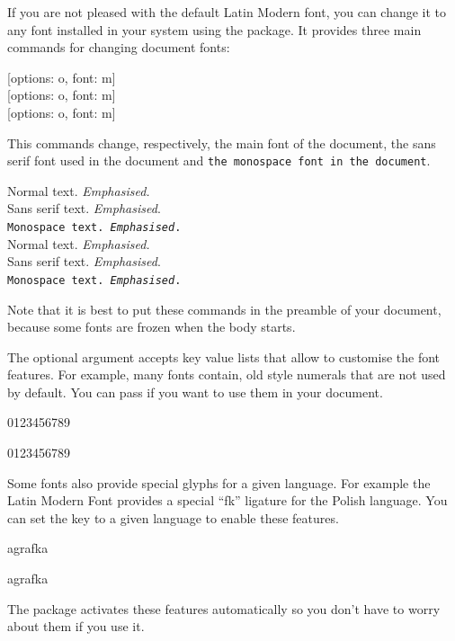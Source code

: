 If you are not pleased with the default Latin Modern font, you can change it to
any font installed in your system using the  package. It provides
three main commands for changing document fonts:
\begin{lscommand}
  [options: o, font: m] \\
  [options: o, font: m] \\
  [options: o, font: m]
\end{lscommand}
This commands change, respectively, the main font of the document, \textsf{the
  sans serif font used in the document} and \texttt{the monospace font in the
  document}.
\begin{example}
Normal text.
  \emph{Emphasised.} \\
\textsf{Sans serif text.
  \emph{Emphasised}.} \\
\texttt{Monospace text.
  \emph{Emphasised}.} \\

\setmainfont{Source Serif 4}
\setsansfont{Source Sans 3}
\setmonofont{Source Code Pro}
Normal text.
  \emph{Emphasised.} \\
\textsf{Sans serif text.
  \emph{Emphasised}.} \\
\texttt{Monospace text.
  \emph{Emphasised}.}
\end{example}
Note that it is best to put these commands in the preamble of your document,
because some fonts are frozen when the body starts.

The optional  argument accepts key value lists that allow to
customise the font features. For example, many fonts contain,
old style numerals that are not used by default. You can pass
 if you want to use them in your document.
\begin{example}
\setmainfont{Source Serif 4}
0123456789

\setmainfont[
  Numbers=OldStyle,
]{Source Serif 4}
0123456789
\end{example}

Some fonts also provide special glyphs for a given language. For example the
Latin Modern Font provides a special
\enquote{\setmainfont[Language=Polish]{Latin Modern Roman}fk} ligature for the
Polish language. You can set the  key to a given language to
enable these features.
\begin{example}
agrafka

\setmainfont[
  Language=Polish,
]{Latin Modern Roman}
agrafka
\end{example}
The  package activates these features automatically so you
don't have to worry about them if you use it.

